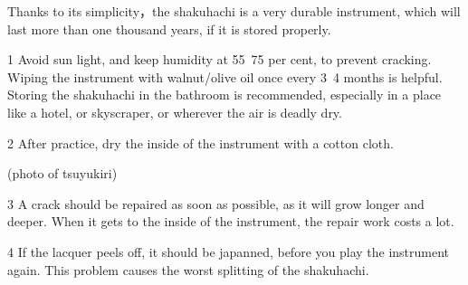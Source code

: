 ﻿Thanks to its simplicity，the shakuhachi is a very durable instrument, which will last more than one thousand years, if it is stored properly. 

\par

1  Avoid sun light, and keep humidity at 55~75 per cent, to prevent cracking.\\
   Wiping the instrument with walnut/olive oil once every 3~4 months is helpful.\\
   Storing the shakuhachi in the bathroom is recommended, especially in a place like a hotel, or skyscraper, or wherever the air is deadly dry. 

\par

2  After practice, dry the inside of the instrument with a cotton cloth.

\par
               
   (photo of tsuyukiri) 

\par

3  A crack should be repaired as soon as possible, as it will grow longer and deeper.
   When it gets to the inside of the instrument, the repair work costs a lot.

\par

4  If the lacquer peels off, it should be japanned, before you play the 
   instrument again. This problem causes the worst splitting of the shakuhachi.




	
